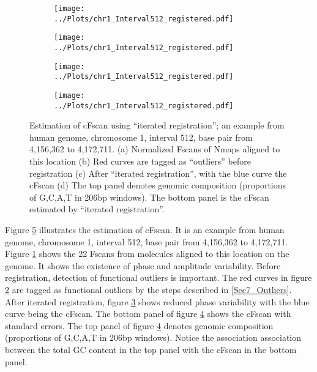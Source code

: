 \begin{figure}[H]
\centering
\begin{subfigure}{0.45\linewidth}
\texttt{[image: ../Plots/chr1\_Interval512\_registered.pdf]}
\caption{}
\label{fig:cFscan_a}
\end{subfigure}
\begin{subfigure}{0.45\linewidth}
\texttt{[image: ../Plots/chr1\_Interval512\_registered.pdf]} \\
\caption{}
\label{fig:cFscan_b}
\end{subfigure}
\begin{subfigure}{0.45\linewidth}
\texttt{[image: ../Plots/chr1\_Interval512\_registered.pdf]}
\caption{}
\label{fig:cFscan_c}
\end{subfigure}
\begin{subfigure}{0.45\linewidth}
\texttt{[image: ../Plots/chr1\_Interval512\_registered.pdf]}
\caption{}
\label{fig:cFscan_d}
\end{subfigure}
\caption{Estimation of cFscan using ``iterated registration''; an example from human genome, chromosome 1, interval 512, base pair from 4,156,362 to 4,172,711. (a) Normalized Fscans of Nmaps aligned to this location (b) Red curves are tagged as ``outliers'' before registration (c) After ``iterated registration'', with the blue curve the cFscan (d) The top panel denotes genomic composition (proportions of G,C,A,T in 206bp windows). The bottom panel is the cFscan estimated by ``iterated registration''. } 
\label{fig:cFscan}
\end{figure}

Figure \ref{fig:cFscan} illustrates the estimation of cFscan. It is an example from human genome, chromosome 1, interval 512, base pair from 4,156,362 to 4,172,711. Figure \ref{fig:cFscan_a} shows the 22 Fscans from molecules aligned to this location on the genome. It shows the existence of phase and amplitude variability. Before registration, detection of functional outliers is important. The red curves in figure \ref{fig:cFscan_b} are tagged as functional outliers by the steps described in \ref{Sec7_Outliers}. After iterated registration, figure \ref{fig:cFscan_c} shows reduced phase variability with the blue curve being the cFscan. The bottom panel of figure \ref{fig:cFscan_d} shows the cFscan with standard errors. The top panel of figure \ref{fig:cFscan_d} denotes genomic composition (proportions of G,C,A,T in 206bp windows). Notice the association association between the total GC content in the top panel with the cFscan in the bottom panel. 

